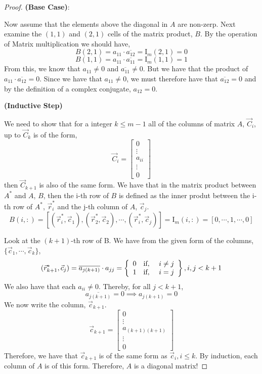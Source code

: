 \documentclass{article}
\begin{document}
\begin{enumerate}
\begin{proof}
\textbf{(Base Case)}: 

Now assume that the elements above the diagonal in $A$ are non-zerp. Next examine the $(1, 1)$ and $(2, 1)$ cells of the matrix product, $B$. By the operation of Matrix multiplication we should have, 
\[
    B(2, 1) = a_{11} \cdot \overline{a_{12}} = \mathrm{I}_m(2, 1) = 0
\]
\[
    B(1, 1) = a_{11} \cdot \overline{a_{11}} = \mathrm{I}_m(1, 1) = 1
\]
From this, we know that $a_{11} \neq 0$ and $\overline{a_{11}} \neq 0$. But we have that the product of $a_{11} \cdot \overline{a_{12}} = 0$. Since we have that  $a_{11} \neq 0$, we must therefore have that $\overline{a_{12}} = 0$ and by the definition of a complex conjugate, $a_{12} = 0$. 

\textbf{(Inductive Step)}

We need to show that for a integer $k \le m-1$ all of the columns of matrix $A$, $\vec{C}_i$, up to $\vec{C}_k$ is of the form, 
\[
    \vec{C}_i = \left[\begin{array}{c}
                0 \\
                \vdots \\
                a_{ii} \\
                \vdots \\
                0
                \end{array}\right]
\]
then $\vec{C}_{k+1}$ is also of the same form. We have that in the matrix product between $A^*$ and $A$, $B$, then the i-th row of $B$ is defined as the inner produt between the i-th row of $A^*$, $\vec{r}_i^*$ and the j-th column of $A$, $\vec{c}_j$.  
\[
    B(i, :) = [(\vec{r}_i^*, \vec{c}_1), (\vec{r}_2^*, \vec{c}_2), \cdots, (\vec{r}_i^*, \vec{c}_j)] = \mathrm{I}_m(i, :) = [0, \cdots, 1, \cdots, 0]
\]

Look at the $(k+1)$-th row of B. We have from the given form of the columns, $\{\vec{c}_1, \cdots, \vec{c}_k\}$, 
\[
    (\vec{r}_{k+1}^*, \vec{c}_j) = \overline{a_{j(k+1)}}\cdot a_{jj} = \left\{\begin{array}{c c c}
                                                                0 & \text{if, } & i \neq j\\
                                                                1 & \text{if, } & i = j
                                                            \end{array}\right\}, i, j < k+1
\]
We also have that each $a_{ii} \neq 0$. Thereby, for all $j < k+1$, 
\[\overline{a_{j(k+1)}} = 0 \implies a_{j(k+1)} = 0\]We now write the column, $\vec{c}_{k+1}$. 
\[  
    \vec{c}_{k+1} = \left[\begin{array}{c}
                    0 \\
                    \vdots \\
                    a_{(k+1)(k+1)} \\
                    \vdots \\
                    0
                    \end{array}\right]
\]
Therefore, we have that $\vec{c}_{k+1}$ is of the same form as $\vec{c}_{i}, i \le k$. By induction, each column of $A$ is of this form. Therefore, $A$ is a diagonal matrix!



\end{proof}
\end{enumerate}
\end{document}
